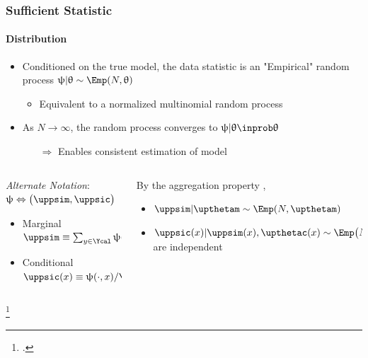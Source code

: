 \documentclass[aspectratio=169]{beamer}
\begin{document}
\begin{frame}
\frametitle{Sufficient Statistic}
\framesubtitle{Distribution}

\begin{itemize}
\item Conditioned on the true model, the data statistic is an "Empirical" random process $\uppsi | \uptheta \sim \Emp(N,\uptheta)$
\begin{itemize}
\item Equivalent to a normalized multinomial random process 
\end{itemize}
\item As $N \to \infty$, the random process converges to $\uppsi | \uptheta \inprob \uptheta$
\begin{itemize}
\item [$\Rightarrow$] Enables \alert{consistent} estimation of model
\end{itemize}

\end{itemize}



\hrulefill

\begin{columns}[c]

\begin{column}{.5\linewidth}
\textit{Alternate Notation}: $\uppsi \Leftrightarrow \big( \uppsim,\uppsic \big)$
\begin{itemize}
\item Marginal $\uppsim \equiv \sum_{y \in \Ycal} \uppsi(y,\cdot)$
\item Conditional $\uppsic(x) \equiv \uppsi(\cdot,x) / \uppsim(x)$
\end{itemize}
\end{column}

\begin{column}{.5\linewidth}
By the aggregation property \footnotemark,
\begin{itemize}
\item $\uppsim | \upthetam \sim \Emp(N,\upthetam)$
\item $\uppsic(x) | \uppsim(x),\upthetac(x) \sim \Emp\big( N \uppsim(x),\upthetac(x) \big)$ are independent
\end{itemize}
\end{column}

\end{columns}

\footcitetext{johnson}

\end{frame}
\end{document}

